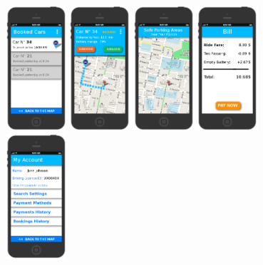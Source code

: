 \documentclass[11pt]{article} %
\begin{document}
\begin{figure}[H]
	\includegraphics[width=0.2\textwidth]{mockup/5CarBookedList.png}
	\includegraphics[width=0.2\textwidth]{mockup/6CarBookedSelected.png}
	\includegraphics[width=0.2\textwidth]{mockup/7WhileDriving.png}
	\includegraphics[width=0.2\textwidth]{mockup/8Bill.png}
	\includegraphics[width=0.2\textwidth]{mockup/9MyAccount.png}

\end{figure}
\end{document}
